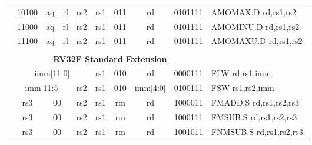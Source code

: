 \begin{table}[p]
\begin{small}
\begin{center}
\begin{tabular}{p{0in}p{0.4in}p{0.05in}p{0.05in}p{0.05in}p{0.05in}p{0.4in}p{0.6in}p{0.4in}p{0.6in}p{0.7in}l}
&
\multicolumn{2}{|c|}{10100} &
\multicolumn{1}{c|}{aq} &
\multicolumn{1}{c|}{rl} &
\multicolumn{2}{c|}{rs2} &
\multicolumn{1}{c|}{rs1} &
\multicolumn{1}{c|}{011} &
\multicolumn{1}{c|}{rd} &
\multicolumn{1}{c|}{0101111} & AMOMAX.D rd,rs1,rs2 \\
\cline{2-11}
  

&
\multicolumn{2}{|c|}{11000} &
\multicolumn{1}{c|}{aq} &
\multicolumn{1}{c|}{rl} &
\multicolumn{2}{c|}{rs2} &
\multicolumn{1}{c|}{rs1} &
\multicolumn{1}{c|}{011} &
\multicolumn{1}{c|}{rd} &
\multicolumn{1}{c|}{0101111} & AMOMINU.D rd,rs1,rs2 \\
\cline{2-11}
  

&
\multicolumn{2}{|c|}{11100} &
\multicolumn{1}{c|}{aq} &
\multicolumn{1}{c|}{rl} &
\multicolumn{2}{c|}{rs2} &
\multicolumn{1}{c|}{rs1} &
\multicolumn{1}{c|}{011} &
\multicolumn{1}{c|}{rd} &
\multicolumn{1}{c|}{0101111} & AMOMAXU.D rd,rs1,rs2 \\
\cline{2-11}
  

&
\multicolumn{10}{c}{} & \\
&
\multicolumn{10}{c}{\bf RV32F Standard Extension} & \\
\cline{2-11}
  

&
\multicolumn{6}{|c|}{imm[11:0]} &
\multicolumn{1}{c|}{rs1} &
\multicolumn{1}{c|}{010} &
\multicolumn{1}{c|}{rd} &
\multicolumn{1}{c|}{0000111} & FLW rd,rs1,imm \\
\cline{2-11}
  

&
\multicolumn{4}{|c|}{imm[11:5]} &
\multicolumn{2}{c|}{rs2} &
\multicolumn{1}{c|}{rs1} &
\multicolumn{1}{c|}{010} &
\multicolumn{1}{c|}{imm[4:0]} &
\multicolumn{1}{c|}{0100111} & FSW rs1,rs2,imm \\
\cline{2-11}
  

&
\multicolumn{2}{|c|}{rs3} &
\multicolumn{2}{c|}{00} &
\multicolumn{2}{c|}{rs2} &
\multicolumn{1}{c|}{rs1} &
\multicolumn{1}{c|}{rm} &
\multicolumn{1}{c|}{rd} &
\multicolumn{1}{c|}{1000011} & FMADD.S rd,rs1,rs2,rs3 \\
\cline{2-11}
  

&
\multicolumn{2}{|c|}{rs3} &
\multicolumn{2}{c|}{00} &
\multicolumn{2}{c|}{rs2} &
\multicolumn{1}{c|}{rs1} &
\multicolumn{1}{c|}{rm} &
\multicolumn{1}{c|}{rd} &
\multicolumn{1}{c|}{1000111} & FMSUB.S rd,rs1,rs2,rs3 \\
\cline{2-11}
  

&
\multicolumn{2}{|c|}{rs3} &
\multicolumn{2}{c|}{00} &
\multicolumn{2}{c|}{rs2} &
\multicolumn{1}{c|}{rs1} &
\multicolumn{1}{c|}{rm} &
\multicolumn{1}{c|}{rd} &
\multicolumn{1}{c|}{1001011} & FNMSUB.S rd,rs1,rs2,rs3 \\
\cline{2-11}
  


\end{tabular}
\end{center}
\end{small}
\end{table}
